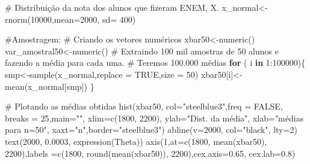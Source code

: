 \documentclass[
  letterpaper,
  DIV=11,
  numbers=noendperiod]{scrartcl}
\newenvironment{Shaded}{\begin{snugshade}}{\end{snugshade}}
\newcommand{\AttributeTok}[1]{\textcolor[rgb]{0.40,0.45,0.13}{#1}}
\newcommand{\CommentTok}[1]{\textcolor[rgb]{0.37,0.37,0.37}{#1}}
\newcommand{\ConstantTok}[1]{\textcolor[rgb]{0.56,0.35,0.01}{#1}}
\newcommand{\ControlFlowTok}[1]{\textcolor[rgb]{0.00,0.23,0.31}{\textbf{#1}}}
\newcommand{\DecValTok}[1]{\textcolor[rgb]{0.68,0.00,0.00}{#1}}
\newcommand{\FloatTok}[1]{\textcolor[rgb]{0.68,0.00,0.00}{#1}}
\newcommand{\FunctionTok}[1]{\textcolor[rgb]{0.28,0.35,0.67}{#1}}
\newcommand{\NormalTok}[1]{\textcolor[rgb]{0.00,0.23,0.31}{#1}}
\newcommand{\OtherTok}[1]{\textcolor[rgb]{0.00,0.23,0.31}{#1}}
\newcommand{\SpecialCharTok}[1]{\textcolor[rgb]{0.37,0.37,0.37}{#1}}
\newcommand{\StringTok}[1]{\textcolor[rgb]{0.13,0.47,0.30}{#1}}
\begin{document}
\begin{Shaded}
\begin{Highlighting}[]
\CommentTok{\# Distribuição da nota dos alunos que fizeram ENEM, X. }
\NormalTok{x\_normal}\OtherTok{\textless{}{-}}\FunctionTok{rnorm}\NormalTok{(}\DecValTok{10000}\NormalTok{,}\AttributeTok{mean=}\DecValTok{2000}\NormalTok{, }\AttributeTok{sd=} \DecValTok{400}\NormalTok{)}

\CommentTok{\#Amostragem:}
\CommentTok{\# Criando os vetores numéricos }
\NormalTok{xbar50}\OtherTok{\textless{}{-}}\FunctionTok{numeric}\NormalTok{()}
\NormalTok{var\_amostral50}\OtherTok{\textless{}{-}}\FunctionTok{numeric}\NormalTok{()}
\CommentTok{\# Extraindo 100 mil amostras de 50 alunos e fazendo a média para cada uma. }
\CommentTok{\# Teremos 100.000 médias  }
\ControlFlowTok{for}\NormalTok{ ( i }\ControlFlowTok{in} \DecValTok{1}\SpecialCharTok{:}\DecValTok{100000}\NormalTok{)\{}
\NormalTok{  smp}\OtherTok{\textless{}{-}}\FunctionTok{sample}\NormalTok{(x\_normal,}\AttributeTok{replace =} \ConstantTok{TRUE}\NormalTok{,}\AttributeTok{size =} \DecValTok{50}\NormalTok{)}
\NormalTok{  xbar50[i]}\OtherTok{\textless{}{-}}\FunctionTok{mean}\NormalTok{(x\_normal[smp])}
\NormalTok{\}}

\CommentTok{\# Plotando as médias obtidas}
\FunctionTok{hist}\NormalTok{(xbar50, }\AttributeTok{col=}\StringTok{"steelblue3"}\NormalTok{,}\AttributeTok{freq =} \ConstantTok{FALSE}\NormalTok{, }\AttributeTok{breaks =} \DecValTok{25}\NormalTok{,}\AttributeTok{main=}\StringTok{""}\NormalTok{,}
     \AttributeTok{xlim=}\FunctionTok{c}\NormalTok{(}\DecValTok{1800}\NormalTok{, }\DecValTok{2200}\NormalTok{), }\AttributeTok{ylab=}\StringTok{"Dist. da média"}\NormalTok{, }\AttributeTok{xlab=}\StringTok{"médias para n=50"}\NormalTok{,}
     \AttributeTok{xaxt=}\StringTok{"n"}\NormalTok{,}\AttributeTok{border=}\StringTok{"steelblue3"}\NormalTok{)}
\FunctionTok{abline}\NormalTok{(}\AttributeTok{v=}\DecValTok{2000}\NormalTok{, }\AttributeTok{col=}\StringTok{"black"}\NormalTok{, }\AttributeTok{lty=}\DecValTok{2}\NormalTok{)}
\FunctionTok{text}\NormalTok{(}\DecValTok{2000}\NormalTok{, }\FloatTok{0.0003}\NormalTok{, }\FunctionTok{expression}\NormalTok{(Theta))}
\FunctionTok{axis}\NormalTok{(}\DecValTok{1}\NormalTok{,}\AttributeTok{at=}\FunctionTok{c}\NormalTok{(}\DecValTok{1800}\NormalTok{, }\FunctionTok{mean}\NormalTok{(xbar50), }\DecValTok{2200}\NormalTok{),}\AttributeTok{labels =}\FunctionTok{c}\NormalTok{(}\DecValTok{1800}\NormalTok{, }\FunctionTok{round}\NormalTok{(}\FunctionTok{mean}\NormalTok{(xbar50)),}
    \DecValTok{2200}\NormalTok{),}\AttributeTok{cex.axis=}\FloatTok{0.65}\NormalTok{, }\AttributeTok{cex.lab=}\FloatTok{0.8}\NormalTok{) }
\end{Highlighting}
\end{Shaded}
\end{document}
